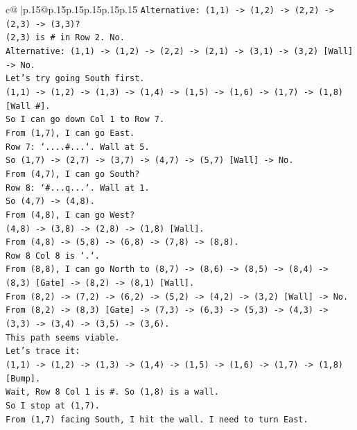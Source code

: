 \documentclass{article}
\begin{document}
{\begin{supertabular}{c@{$\;$}|p{.15\linewidth}@{}p{.15\linewidth}p{.15\linewidth}p{.15\linewidth}p{.15\linewidth}p{.15\linewidth}}
{{{\texttt{Alternative: (1,1) {-}> (1,2) {-}> (2,2) {-}> (2,3) {-}> (3,3)?} \\
\texttt{(2,3) is \# in Row 2. No.} \\
\texttt{Alternative: (1,1) {-}> (1,2) {-}> (2,2) {-}> (2,1) {-}> (3,1) {-}> (3,2) {[}Wall{]} {-}> No.} \\
\texttt{Let's try going South first.} \\
\texttt{(1,1) {-}> (1,2) {-}> (1,3) {-}> (1,4) {-}> (1,5) {-}> (1,6) {-}> (1,7) {-}> (1,8) {[}Wall \#{]}.} \\
\texttt{So I can go down Col 1 to Row 7.} \\
\texttt{From (1,7), I can go East.} \\
\texttt{Row 7: `....\#...`. Wall at 5.} \\
\texttt{So (1,7) {-}> (2,7) {-}> (3,7) {-}> (4,7) {-}> (5,7) {[}Wall{]} {-}> No.} \\
\texttt{From (4,7), I can go South?} \\
\texttt{Row 8: `\#...q...`. Wall at 1.} \\
\texttt{So (4,7) {-}> (4,8).} \\
\texttt{From (4,8), I can go West?} \\
\texttt{(4,8) {-}> (3,8) {-}> (2,8) {-}> (1,8) {[}Wall{]}.} \\
\texttt{From (4,8) {-}> (5,8) {-}> (6,8) {-}> (7,8) {-}> (8,8).} \\
\texttt{Row 8 Col 8 is `.`.} \\
\texttt{From (8,8), I can go North to (8,7) {-}> (8,6) {-}> (8,5) {-}> (8,4) {-}> (8,3) {[}Gate{]} {-}> (8,2) {-}> (8,1) {[}Wall{]}.} \\
\texttt{From (8,2) {-}> (7,2) {-}> (6,2) {-}> (5,2) {-}> (4,2) {-}> (3,2) {[}Wall{]} {-}> No.} \\
\texttt{From (8,2) {-}> (8,3) {[}Gate{]} {-}> (7,3) {-}> (6,3) {-}> (5,3) {-}> (4,3) {-}> (3,3) {-}> (3,4) {-}> (3,5) {-}> (3,6).} \\
\texttt{This path seems viable.} \\
\texttt{Let's trace it:} \\
\texttt{(1,1) {-}> (1,2) {-}> (1,3) {-}> (1,4) {-}> (1,5) {-}> (1,6) {-}> (1,7) {-}> (1,8) {[}Bump{]}.} \\
\texttt{Wait, Row 8 Col 1 is \#. So (1,8) is a wall.} \\
\texttt{So I stop at (1,7).} \\
\texttt{From (1,7) facing South, I hit the wall. I need to turn East.} \\
}}}
\end{supertabular}}
\end{document}
